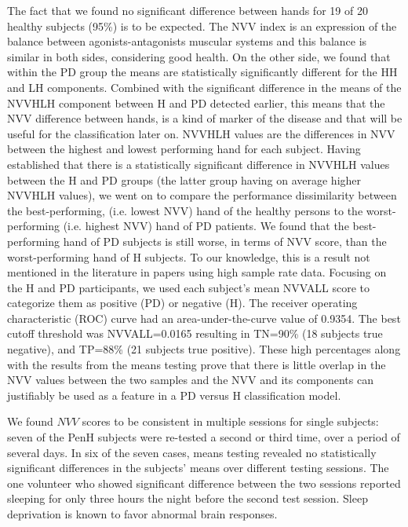 The fact that we found no significant difference between hands for 19 of 20 healthy subjects (95\%) is to be expected. The NVV index is an expression of the balance between agonists-antagonists muscular systems and this balance is similar in both sides, considering good health. On the other side, we found that within the PD group the means are statistically significantly different for the HH and LH components. Combined with the significant difference in the means of the NVVHLH component between H and PD detected earlier, this means that the NVV difference between hands, is a kind of marker of the disease and that will be useful for the classification later on. 
NVVHLH values are the differences in NVV between the highest and lowest performing hand for each subject. Having established that there is a statistically significant difference in NVVHLH values between the H and PD groups (the latter group having on average higher NVVHLH values), we went on to compare the performance dissimilarity between the best-performing, (i.e. lowest NVV) hand of the healthy persons to the worst-performing (i.e. highest NVV) hand of PD patients. We found that the best-performing hand of PD subjects is still worse, in terms of NVV score, than the worst-performing hand of H subjects. To our knowledge, this is a result not mentioned in the literature in papers using high sample rate data. 
Focusing on the H and PD participants, we used each subject’s mean NVVALL score to categorize them as positive (PD) or negative (H). The receiver operating characteristic (ROC) curve had an area-under-the-curve value of 0.9354. The best cutoff threshold was NVVALL=0.0165 resulting in TN=90\% (18 subjects true negative), and TP=88\% (21 subjects true positive). These high percentages along with the results from the means testing prove that there is little overlap in the NVV values between the two samples and the NVV and its components can justifiably be used as a feature in a PD versus H classification model. 

We found $NVV$ scores to be consistent in multiple sessions for single subjects: seven of the \gls{PenH} subjects were re-tested a second or third time, over a period of several days. In six of the seven cases, means testing revealed no statistically significant differences in the subjects’ means over different testing sessions. The one volunteer who showed significant difference between the two sessions reported sleeping for only three hours the night before the second test session. Sleep deprivation is known to favor abnormal brain responses.


